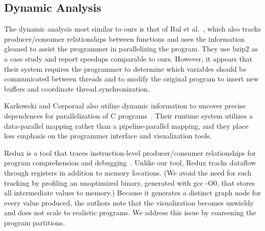 \subsection*{Dynamic Analysis}

\enlargethispage{0.7\baselineskip}
The dynamic analysis most similar to ours is that of Rul et
al.~\cite{rul06functionlevel}, which also tracks producer/consumer
relationships between functions and uses the information gleaned to
assist the programmer in parallelizing the program.  They use bzip2 as
a case study and report speedups comparable to ours.  
However, it appears that their system requires the programmer to
determine which variables should be communicated between threads
and to modify the original program to insert new buffers and
coordinate thread synchronization.

Karkowski and Corporaal also utilize dynamic information to uncover
precise dependences for parallelization of C
programs~\cite{karkowski97overcoming}.  Their runtime system utilizes
a data-parallel mapping rather than a pipeline-parallel mapping, and
they place less emphasis on the programmer interface and visualization
tools.


%
%

Redux is a tool that traces instruction-level producer/consumer
relationships for program comprehension and
debugging~\cite{nethercote03redux}.
Unlike our tool, Redux tracks dataflow through registers in addition
to memory locations.  (We avoid the need for such tracking by
profiling an unoptimized binary, generated with gcc -O0, that stores
all intermediate values to memory.)  Because it generates a distinct
graph node for every value produced, the authors note that the
visualization becomes unwieldy and does not scale to realistic
programs.  We address this issue by coarsening the program partitions.


